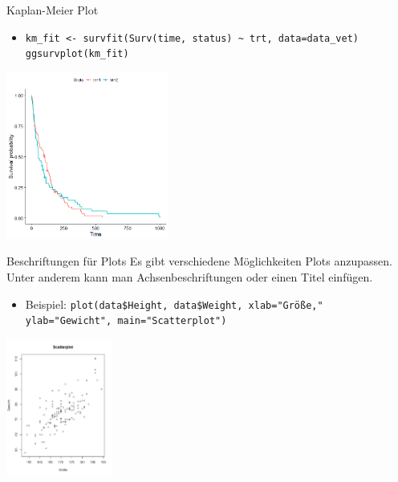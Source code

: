 \documentclass[aspectratio = 169]{chariteBeamer}
\begin{document}
\begin{frame}[fragile]{Kaplan-Meier Plot}
	\begin{itemize}
		\item \verb+km_fit <- survfit(Surv(time, status) ~ trt, data=data_vet)+ \\ \verb+ggsurvplot(km_fit)+
	\end{itemize}
			
	\begin{center}
		\includegraphics[height=5.5cm]{KM3}
	\end{center}
\end{frame}

\begin{frame}[fragile]{Beschriftungen für Plots}
	Es gibt verschiedene Möglichkeiten Plots anzupassen. Unter anderem kann man Achsenbeschriftungen oder einen Titel einfügen.
	\begin{itemize}
		\item Beispiel: \verb+plot(data$Height, data$Weight, xlab="Größe,"+
		\verb+            ylab="Gewicht", main="Scatterplot")+
	\end{itemize}
			
	\begin{center}
		\includegraphics[height=4.5cm]{AnnotatedPlot}
	\end{center}
\end{frame}
\end{document}
